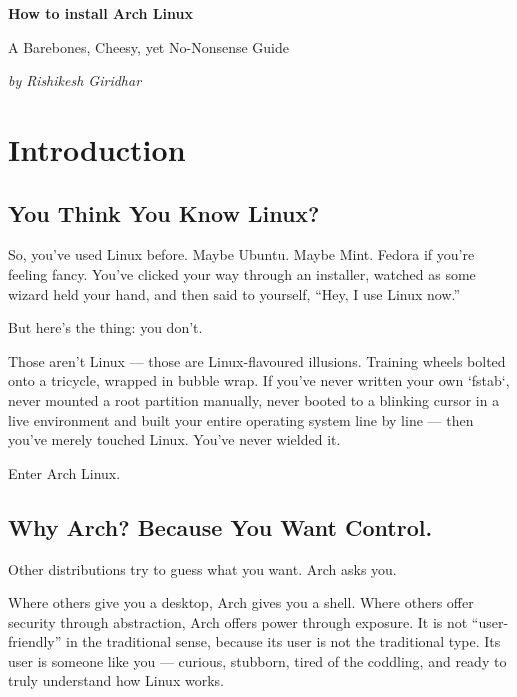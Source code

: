 \documentclass[12pt,openany]{book}
\begin{document}
\begin{titlepage}
    \centering
    \vspace*{4cm}
    {\Huge\bfseries How to install Arch Linux \par}
    \vspace{1cm}
    {\Large A Barebones, Cheesy, yet No-Nonsense Guide \par}
    \vspace{2cm}
    {\Large \textit{by Rishikesh Giridhar} \par}
    \vfill
\end{titlepage}

\tableofcontents
\newpage

\chapter{Introduction}

\section*{You Think You Know Linux?}

So, you’ve used Linux before. Maybe Ubuntu. Maybe Mint. Fedora if you're feeling fancy. You’ve clicked your way through an installer, watched as some wizard held your hand, and then said to yourself, “Hey, I use Linux now.”

But here's the thing: you don’t.

Those aren’t Linux — those are Linux-flavoured illusions. Training wheels bolted onto a tricycle, wrapped in bubble wrap. If you’ve never written your own `fstab`, never mounted a root partition manually, never booted to a blinking cursor in a live environment and built your entire operating system line by line — then you’ve merely touched Linux. You’ve never wielded it.

Enter Arch Linux.

\section*{Why Arch? Because You Want Control.}

Other distributions try to guess what you want. Arch asks you.

Where others give you a desktop, Arch gives you a shell. Where others offer security through abstraction, Arch offers power through exposure. It is not “user-friendly” in the traditional sense, because its user is not the traditional type. Its user is someone like you — curious, stubborn, tired of the coddling, and ready to truly understand how Linux works.
\end{document}

